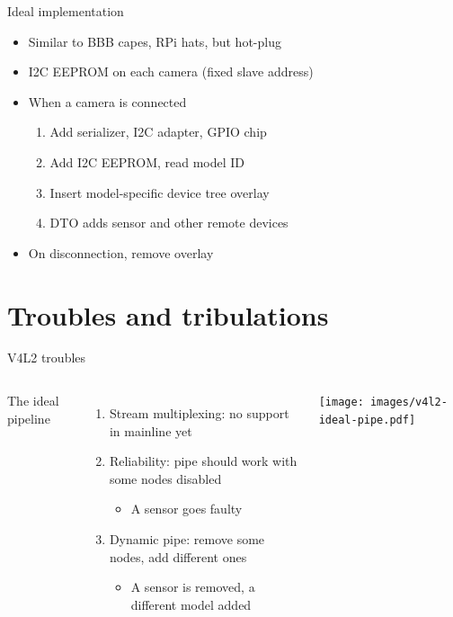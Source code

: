 \documentclass[xetex,table,aspectratio=169]{beamer}
\begin{document}
\begin{frame}{Ideal implementation}
  \begin{itemize}
  \item Similar to BBB capes, RPi hats, but hot-plug
  \item I2C EEPROM on each camera (fixed slave address)
  \item When a camera is connected
    \begin{enumerate}
    \item Add serializer, I2C adapter, GPIO chip
    \item Add I2C EEPROM, read model ID
    \item Insert model-specific device tree overlay
    \item DTO adds sensor and other remote devices
    \end{enumerate}
  \item On disconnection, remove overlay
  \end{itemize}
\end{frame}


\section{Troubles and tribulations}

\begin{frame}{V4L2 troubles}
  \begin{columns}
    \begin{flushright}
      The ideal pipeline \textrightarrow
    \end{flushright}

    \vspace{0.2\textheight}

    \begin{enumerate}
    \item Stream multiplexing: no support in mainline yet
    \item Reliability: pipe should work with some nodes disabled
      \begin{itemize}
      \item A sensor goes faulty
      \end{itemize}
    \item Dynamic pipe: remove some nodes, add different ones
      \begin{itemize}
      \item A sensor is removed, a different model added
      \end{itemize}
    \end{enumerate}

    \center\texttt{[image: images/v4l2-ideal-pipe.pdf]}
  \end{columns}
\end{frame}
\end{document}
